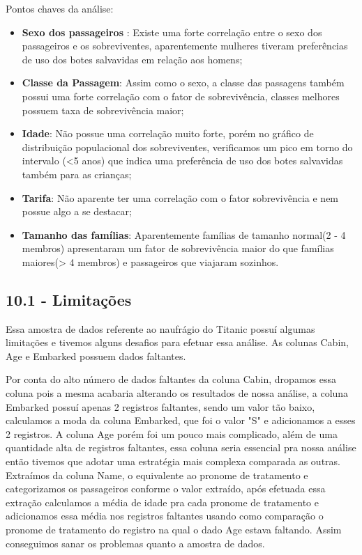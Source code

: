 \documentclass[11pt]{article}
\begin{document}
Pontos chaves da análise:

\begin{itemize}
\item
  \textbf{Sexo dos passageiros} : Existe uma forte correlação entre o
  sexo dos passageiros e os sobreviventes, aparentemente mulheres
  tiveram preferências de uso dos botes salvavidas em relação aos
  homens;
\item
  \textbf{Classe da Passagem}: Assim como o sexo, a classe das passagens
  também possui uma forte correlação com o fator de sobrevivência,
  classes melhores possuem taxa de sobrevivência maior;
\item
  \textbf{Idade}: Não possue uma correlação muito forte, porém no
  gráfico de distribuição populacional dos sobreviventes, verificamos um
  pico em torno do intervalo (\textless{}5 anos) que indica uma
  preferência de uso dos botes salvavidas também para as crianças;
\item
  \textbf{Tarifa}: Não aparente ter uma correlação com o fator
  sobrevivência e nem possue algo a se destacar;
\item
  \textbf{Tamanho das famílias}: Aparentemente famílias de tamanho
  normal(2 - 4 membros) apresentaram um fator de sobrevivência maior do
  que famílias maiores(\textgreater{} 4 membros) e passageiros que
  viajaram sozinhos.
\end{itemize}

    \subsection{10.1 - Limitações}\label{limitauxe7uxf5es}

Essa amostra de dados referente ao naufrágio do Titanic possuí algumas
limitações e tivemos alguns desafios para efetuar essa análise. As
colunas Cabin, Age e Embarked possuem dados faltantes.

Por conta do alto número de dados faltantes da coluna Cabin, dropamos
essa coluna pois a mesma acabaria alterando os resultados de nossa
análise, a coluna Embarked possuí apenas 2 registros faltantes, sendo um
valor tão baixo, calculamos a moda da coluna Embarked, que foi o valor
"S" e adicionamos a esses 2 registros. A coluna Age porém foi um pouco
mais complicado, além de uma quantidade alta de registros faltantes,
essa coluna seria essencial pra nossa análise então tivemos que adotar
uma estratégia mais complexa comparada as outras. Extraímos da coluna
Name, o equivalente ao pronome de tratamento e categorizamos os
passageiros conforme o valor extraído, após efetuada essa extração
calculamos a média de idade pra cada pronome de tratamento e adicionamos
essa média nos registros faltantes usando como comparação o pronome de
tratamento do registro na qual o dado Age estava faltando. Assim
conseguimos sanar os problemas quanto a amostra de dados.
\end{document}
